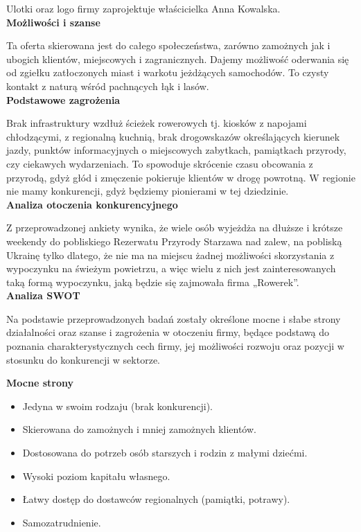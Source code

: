 \documentclass{sprawozdanie-agh}
\begin{document}
		Ulotki oraz logo firmy zaprojektuje właścicielka Anna Kowalska.\\
		\textbf{Możliwości i szanse}
		
		Ta oferta skierowana jest do całego społeczeństwa, zarówno zamożnych jak i ubogich klientów, miejscowych i zagranicznych. Dajemy możliwość oderwania się od zgiełku zatłoczonych miast i warkotu jeżdżących samochodów. To czysty kontakt z naturą wśród pachnących łąk i lasów.\\
		\textbf{Podstawowe zagrożenia}
		
		Brak infrastruktury wzdłuż ścieżek rowerowych tj. kiosków z napojami chłodzącymi, z regionalną kuchnią, brak drogowskazów określających kierunek jazdy, punktów informacyjnych o miejscowych zabytkach, pamiątkach przyrody, czy ciekawych wydarzeniach. To spowoduje skrócenie czasu obcowania z przyrodą, gdyż głód i zmęczenie pokieruje klientów w drogę powrotną. W regionie nie mamy konkurencji, gdyż będziemy pionierami w tej dziedzinie.\\
		\textbf{Analiza otoczenia konkurencyjnego}
		
		Z przeprowadzonej ankiety wynika, że wiele osób wyjeżdża na dłuższe i krótsze weekendy do pobliskiego Rezerwatu Przyrody Starzawa nad zalew, na pobliską Ukrainę tylko dlatego, że nie ma na miejscu żadnej możliwości skorzystania z wypoczynku na świeżym powietrzu, a więc wielu z nich jest zainteresowanych taką formą wypoczynku, jaką będzie się zajmowała firma „Rowerek”.\\
		\textbf{Analiza SWOT}
		
		Na podstawie przeprowadzonych badań zostały określone mocne i słabe strony działalności oraz szanse i zagrożenia w otoczeniu firmy, będące podstawą do poznania charakterystycznych cech firmy, jej możliwości rozwoju oraz pozycji w stosunku do konkurencji w sektorze.
		
		\textbf{Mocne strony}
		\begin{itemize}
			\item Jedyna w swoim rodzaju (brak konkurencji).
			\item Skierowana do zamożnych i mniej zamożnych klientów.
			\item Dostosowana do potrzeb osób starszych i rodzin z małymi dziećmi.
			\item Wysoki poziom kapitału własnego.
			\item Łatwy dostęp do dostawców regionalnych (pamiątki, potrawy).
			\item Samozatrudnienie.
		\end{itemize}
		
\end{document}
